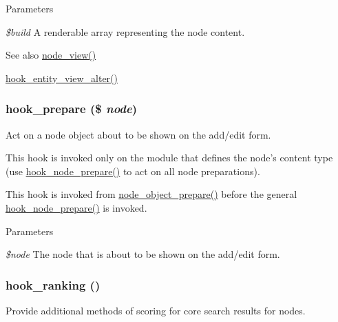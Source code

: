 \begin{DoxyParams}{Parameters}
\item[{\em \$build}]A renderable array representing the node content.\end{DoxyParams}
\begin{DoxySeeAlso}{See also}
\hyperlink{node_8module_ac2c64fdfacc25be79a6ecf406ab62320}{node\_\-view()} 

\hyperlink{group__hooks_ga2c2be6c70815b426f0eb13b0b68edb40}{hook\_\-entity\_\-view\_\-alter()} 
\end{DoxySeeAlso}
\hypertarget{group__node__api__hooks_ga2dff6dd92802df6b776a4eeb0b1a737c}{
\subsubsection[{hook\_\-prepare}]{\setlength{\rightskip}{0pt plus 5cm}hook\_\-prepare (\$ {\em node})}}
\label{group__node__api__hooks_ga2dff6dd92802df6b776a4eeb0b1a737c}
Act on a node object about to be shown on the add/edit form.

This hook is invoked only on the module that defines the node's content type (use \hyperlink{group__node__api__hooks_ga4bbe7320bd52fc6183920c8be2d9d4f6}{hook\_\-node\_\-prepare()} to act on all node preparations).

This hook is invoked from \hyperlink{node_8module_ac12e464390fef44e55ddc2e0a35e9fe2}{node\_\-object\_\-prepare()} before the general \hyperlink{group__node__api__hooks_ga4bbe7320bd52fc6183920c8be2d9d4f6}{hook\_\-node\_\-prepare()} is invoked.


\begin{DoxyParams}{Parameters}
\item[{\em \$node}]The node that is about to be shown on the add/edit form. \end{DoxyParams}
\hypertarget{group__node__api__hooks_gaf7a28ce3230dc96833ea5338fd26f43c}{
\subsubsection[{hook\_\-ranking}]{\setlength{\rightskip}{0pt plus 5cm}hook\_\-ranking ()}}
\label{group__node__api__hooks_gaf7a28ce3230dc96833ea5338fd26f43c}
Provide additional methods of scoring for core search results for nodes.

